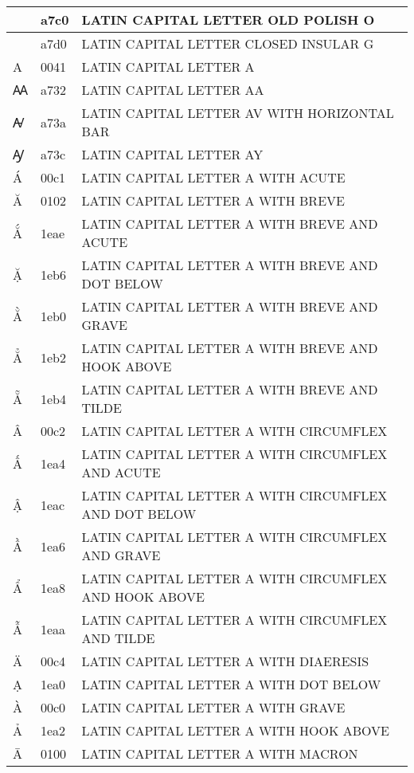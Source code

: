 \documentclass[12pt,letterpaper,openany]{book}
\begin{document}
\begin{center}
\tabletail{\hline}
\tablelasttail{}
\footnotesize
 \begin{supertabular}{|m{0.25in}|m{0.5in}|m{4in}|}
\hline
Ꟁ & a7c0 & LATIN CAPITAL LETTER OLD POLISH O\\\hline
Ꟑ & a7d0 & LATIN CAPITAL LETTER CLOSED INSULAR G\\\hline
A & 0041 & LATIN CAPITAL LETTER A\\\hline
Ꜳ & a732 & LATIN CAPITAL LETTER AA\\\hline
Ꜻ & a73a & LATIN CAPITAL LETTER AV WITH HORIZONTAL BAR\\\hline
Ꜽ & a73c & LATIN CAPITAL LETTER AY\\\hline
Á & 00c1 & LATIN CAPITAL LETTER A WITH ACUTE\\\hline
Ă & 0102 & LATIN CAPITAL LETTER A WITH BREVE\\\hline
Ắ & 1eae & LATIN CAPITAL LETTER A WITH BREVE AND ACUTE\\\hline
Ặ & 1eb6 & LATIN CAPITAL LETTER A WITH BREVE AND DOT BELOW\\\hline
Ằ & 1eb0 & LATIN CAPITAL LETTER A WITH BREVE AND GRAVE\\\hline
Ẳ & 1eb2 & LATIN CAPITAL LETTER A WITH BREVE AND HOOK ABOVE\\\hline
Ẵ & 1eb4 & LATIN CAPITAL LETTER A WITH BREVE AND TILDE\\\hline
Â & 00c2 & LATIN CAPITAL LETTER A WITH CIRCUMFLEX\\\hline
Ấ & 1ea4 & LATIN CAPITAL LETTER A WITH CIRCUMFLEX AND ACUTE\\\hline
Ậ & 1eac & \scriptsize LATIN CAPITAL LETTER A WITH CIRCUMFLEX AND DOT BELOW\\\hline
Ầ & 1ea6 & LATIN CAPITAL LETTER A WITH CIRCUMFLEX AND GRAVE\\\hline
Ẩ & 1ea8 & \scriptsize LATIN CAPITAL LETTER A WITH CIRCUMFLEX AND HOOK ABOVE\\\hline
Ẫ & 1eaa & LATIN CAPITAL LETTER A WITH CIRCUMFLEX AND TILDE\\\hline
Ä & 00c4 & LATIN CAPITAL LETTER A WITH DIAERESIS\\\hline
Ạ & 1ea0 & LATIN CAPITAL LETTER A WITH DOT BELOW\\\hline
À & 00c0 & LATIN CAPITAL LETTER A WITH GRAVE\\\hline
Ả & 1ea2 & LATIN CAPITAL LETTER A WITH HOOK ABOVE\\\hline
Ā & 0100 & LATIN CAPITAL LETTER A WITH MACRON\\\hline

\end{supertabular}
\end{center}
\end{document}

